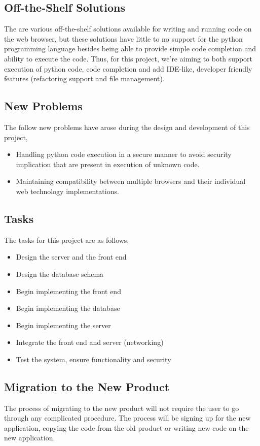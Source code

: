 \documentclass[12pt, titlepage]{article}
\begin{document}
  \subsection{Off-the-Shelf Solutions}
  The are various off-the-shelf solutions available for writing and running
  code on the web browser, but these solutions have little to no support for
  the python programming language besides being able to provide simple code
  completion and ability to execute the code. Thus, for this project, we're
	aiming to both support execution of python code, code completion and add
	IDE-like, developer friendly features (refactoring support and file
	management).

  \subsection{New Problems}
	The follow new problems have arose during the design and development of this
	project,
	\begin{itemize}
		\item Handling python code execution in a secure manner to avoid security
			implication that are present in execution of unknown code.
		\item Maintaining compatibility between multiple browsers and their
			individual web technology implementations.
	\end{itemize}

  \subsection{Tasks}
	The tasks for this project are as follows,
	\begin{itemize}
		\item Design the server and the front end
		\item Design the database schema
		\item Begin implementing the front end
		\item Begin implementing the database
		\item Begin implementing the server
		\item Integrate the front end and server (networking)
		\item Test the system, ensure functionality and security
	\end{itemize}

  \subsection{Migration to the New Product}
	The process of migrating to the new product will not require the user to go
	through any complicated procedure. The process will be signing up for the new
	application, copying the code from the old product or writing new code on the
	new application.
\end{document}
